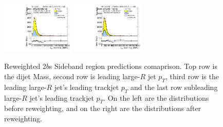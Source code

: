 \begin{figure}[htbp!]
\begin{center}
\includegraphics[angle=270, width=0.31\textwidth]{./figures/boosted/Prereweight/Moriond_TwoTag_split_Sideband_sublHCand_trk0_Pt.pdf}
\includegraphics[angle=270, width=0.31\textwidth]{./figures/boosted/Sideband/b77_TwoTag_split_Sideband_sublHCand_trk0_Pt.pdf}\\
\caption{Reweighted 2$b$s Sideband region predictions comaprison. Top row is the dijet Mass, second row is leading large-$R$ jet $p_{T}$, third row is the leading large-$R$ jet's leading trackjet $p_T$ and the last row subleading large-$R$ jet's leading trackjet $p_T$. On the left are the distributions before reweighting, and on the right are the distributions after reweighting.}
\label{fig:rw-2bs-comp-sb}
\end{center}
\end{figure}


